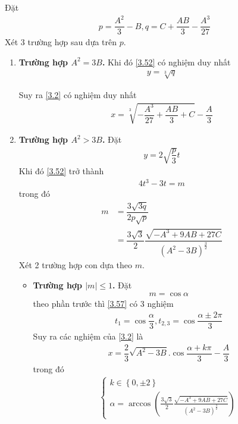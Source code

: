 \documentclass[a4paper,oneside]{book}
\numberwithin{equation}{chapter}
\begin{document}
Đặt 
\begin{align}
p = \dfrac{{{A^2}}}{3} - B,q = C + \dfrac{{AB}}{3} - \dfrac{{{A^3}}}{{27}}
\end{align}
Xét 3 trường hợp sau dựa trên $p$.
\begin{enumerate}
\item \textbf{Trường hợp ${A^2} = 3B$.} Khi đó \eqref{3.52} có nghiệm duy nhất 
\begin{align}
y = \sqrt[3]{q}
\end{align}

Suy ra \eqref{3.2} có nghiệm duy nhất 
\begin{align}
x = \sqrt[3]{{ - \dfrac{{{A^3}}}{{27}} + \dfrac{{AB}}{3} + C}} - \dfrac{A}{3}
\end{align}
\item \textbf{Trường hợp ${A^2} > 3B$.} Đặt 
\begin{align}
y = 2\sqrt {\dfrac{p}{3}} t
\end{align}
Khi đó \eqref{3.52} trở thành
\begin{align}
\label{3.57}
4{t^3} - 3t = m
\end{align}
trong đó
\begin{align}
m &= \dfrac{{3\sqrt {3q} }}{{2p\sqrt p }} \\
&= \dfrac{{3\sqrt 3 }}{2}\dfrac{{\sqrt { - {A^3} + 9AB + 27C} }}{{{{\left( {{A^2} - 3B} \right)}^{\frac{3}{2}}}}}
\end{align}
Xét 2 trường hợp con dựa theo $m$.
\begin{itemize}
\item \textbf{Trường hợp $\left| m \right| \le 1$.} Đặt 
\begin{align}
m = \cos \alpha
\end{align}
theo phần trước thì \eqref{3.57} có 3 nghiệm
\begin{align}
{t_1} = \cos \dfrac{\alpha }{3},{t_{2,3}} = \cos \dfrac{{\alpha  \pm 2\pi }}{3}
\end{align}
Suy ra các nghiệm của \eqref{3.2} là 
\begin{align}
x = \dfrac{2}{3}\sqrt {{A^2} - 3B} .\cos \dfrac{{\alpha  + k\pi }}{3} - \dfrac{A}{3}
\end{align}
trong đó
\begin{align}
\left\{ \begin{array}{l}
k \in \left\{ {0, \pm 2} \right\}\\
\alpha  = \arccos \left( {\frac{{3\sqrt 3 }}{2}\frac{{\sqrt { - {A^3} + 9AB + 27C} }}{{{{\left( {{A^2} - 3B} \right)}^{\frac{3}{2}}}}}} \right)

\end{array}
\end{align}
\end{itemize}
\end{enumerate}
\end{document}
